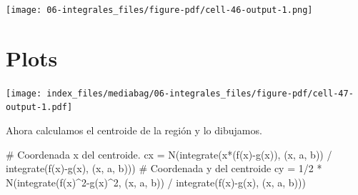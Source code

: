 \documentclass[
  a4paper,
]{scrreport}
\newenvironment{Shaded}{\begin{snugshade}}{\end{snugshade}}
\newcommand{\BuiltInTok}[1]{\textcolor[rgb]{0.00,0.23,0.31}{#1}}
\newcommand{\CommentTok}[1]{\textcolor[rgb]{0.37,0.37,0.37}{#1}}
\newcommand{\DataTypeTok}[1]{\textcolor[rgb]{0.68,0.00,0.00}{#1}}
\newcommand{\FloatTok}[1]{\textcolor[rgb]{0.68,0.00,0.00}{#1}}
\newcommand{\FunctionTok}[1]{\textcolor[rgb]{0.28,0.35,0.67}{#1}}
\newcommand{\ImportTok}[1]{\textcolor[rgb]{0.00,0.46,0.62}{#1}}
\newcommand{\NormalTok}[1]{\textcolor[rgb]{0.00,0.23,0.31}{#1}}
\newcommand{\OperatorTok}[1]{\textcolor[rgb]{0.37,0.37,0.37}{#1}}
\newcommand{\PreprocessorTok}[1]{\textcolor[rgb]{0.68,0.00,0.00}{#1}}
\newcommand{\SpecialCharTok}[1]{\textcolor[rgb]{0.37,0.37,0.37}{#1}}
\newcommand{\StringTok}[1]{\textcolor[rgb]{0.13,0.47,0.30}{#1}}
\theoremstyle{definition}
\theoremstyle{remark}
\begin{document}
\begin{tcolorbox}
\texttt{[image: 06-integrales\_files/figure-pdf/cell-46-output-1.png]}

\section{Plots}

\begin{Shaded}
\end{Shaded}

\texttt{[image: index\_files/mediabag/06-integrales\_files/figure-pdf/cell-47-output-1.pdf]}

Ahora calculamos el centroide de la región y lo dibujamos.

\begin{Shaded}
\begin{Highlighting}[]
\CommentTok{\# Coordenada x del centroide.}
\NormalTok{cx }\OperatorTok{=} \FunctionTok{N}\NormalTok{(}\FunctionTok{integrate}\NormalTok{(}\FunctionTok{x*}\NormalTok{(}\FunctionTok{f}\NormalTok{(x)}\FunctionTok{{-}g}\NormalTok{(x)), (x, a, b)) }\OperatorTok{/} \FunctionTok{integrate}\NormalTok{(}\FunctionTok{f}\NormalTok{(x)}\FunctionTok{{-}g}\NormalTok{(x), (x, a, b)))}
\CommentTok{\# Coordenada y del centroide}
\NormalTok{cy }\OperatorTok{=} \FloatTok{1}\OperatorTok{/}\FloatTok{2} \OperatorTok{*} \FunctionTok{N}\NormalTok{(}\FunctionTok{integrate}\NormalTok{(}\FunctionTok{f}\NormalTok{(x)}\OperatorTok{\^{}}\FloatTok{2}\FunctionTok{{-}g}\NormalTok{(x)}\OperatorTok{\^{}}\FloatTok{2}\NormalTok{, (x, a, b)) }\OperatorTok{/} \FunctionTok{integrate}\NormalTok{(}\FunctionTok{f}\NormalTok{(x)}\FunctionTok{{-}g}\NormalTok{(x), (x, a, b)))}
\end{Highlighting}
\end{Shaded}


\end{tcolorbox}
\end{document}
